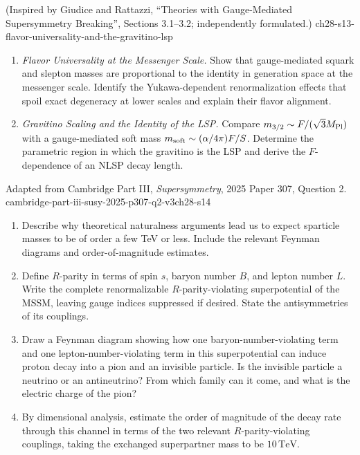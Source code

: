 \begin{enumerate}
    {(Inspired by Giudice and Rattazzi, ``Theories with Gauge-Mediated Supersymmetry Breaking'', Sections 3.1--3.2; independently formulated.)}
    {ch28-s13-flavor-universality-and-the-gravitino-lsp}
  \begin{enumerate}
    \item \emph{Flavor Universality at the Messenger Scale.}
    Show that gauge-mediated squark and slepton masses are proportional to
      the identity in generation space at the messenger scale.  Identify the
      Yukawa-dependent renormalization effects that spoil exact degeneracy at
      lower scales and explain their flavor alignment.
    \item \emph{Gravitino Scaling and the Identity of the LSP.}
    Compare \(m_{3/2}\sim F/(\sqrt3M_{\rm Pl})\) with a gauge-mediated soft
      mass \(m_{\rm soft}\sim(\alpha/4\pi)F/S\).  Determine the parametric
      region in which the gravitino is the LSP and derive the
      \(F\)-dependence of an NLSP decay length.
  \end{enumerate}

    {Adapted from Cambridge Part III, \emph{Supersymmetry}, 2025
    Paper 307, Question 2.}
    {cambridge-part-iii-susy-2025-p307-q2-v3ch28-s14}
  \begin{enumerate}
    \item[(a)]
    Describe why theoretical naturalness arguments lead us to expect
    sparticle masses to be of order a few TeV or less.  Include the relevant
    Feynman diagrams and order-of-magnitude estimates.

    \item[(b)]
    Define \(R\)-parity in terms of spin \(s\), baryon number \(B\), and
    lepton number \(L\).  Write the complete renormalizable
    \(R\)-parity-violating superpotential of the MSSM, leaving gauge indices
    suppressed if desired.  State the antisymmetries of its couplings.

    \item[(c)]
    Draw a Feynman diagram showing how one baryon-number-violating term and
    one lepton-number-violating term in this superpotential can induce proton
    decay into a pion and an invisible particle.  Is the invisible particle
    a neutrino or an antineutrino?  From which family can it come, and what is
    the electric charge of the pion?

    \item[(d)]
    By dimensional analysis, estimate the order of magnitude of the decay
    rate through this channel in terms of the two relevant
    \(R\)-parity-violating couplings, taking the exchanged superpartner mass
    to be \(10\,\mathrm{TeV}\).


\end{enumerate}
\end{enumerate}
